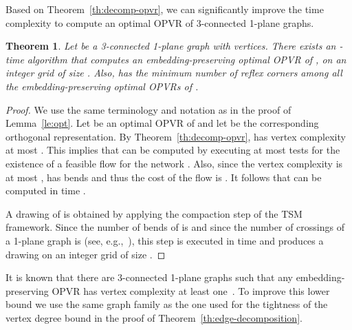 \documentclass{article}
\newtheorem{theorem}{Theorem}
\newcommand{\opvr}{OPVR\xspace}
\begin{document}
Based on Theorem~\ref{th:decomp-opvr}, we can significantly improve the time complexity to compute an optimal \opvr of 3-connected 1-plane graphs.

\begin{theorem}\label{th:3conn-ub}
Let  be a 3-connected 1-plane graph with  vertices. There exists an  -time algorithm that computes an embedding-preserving optimal \opvr  of , on an integer grid of size . Also,  has the minimum number of reflex corners among all the embedding-preserving optimal {\opvr}s of .
\end{theorem}
\begin{proof}
We use the same terminology and notation as in the proof of Lemma~\ref{le:opt}. Let  be an optimal \opvr of  and let  be the corresponding orthogonal representation. By Theorem~\ref{th:decomp-opvr},  has vertex complexity at most . This implies that  can be computed by executing at most  tests for the existence of a feasible flow for the network . Also, since the vertex complexity is at most ,  has  bends and thus the cost of the flow is . It follows that  can be computed in time .

A drawing of  is obtained by applying the compaction step of the TSM framework. Since the number of bends of  is  and since the number of crossings of a 1-plane graph is  (see, e.g.,~\cite{Suzuki2010}), this step is executed in  time and produces a drawing on an integer grid of  size .
\end{proof}


It is known that there are 3-connected 1-plane graphs such that any  embedding-preserving \opvr has vertex complexity at least one~\cite{SoCG}. To improve this lower bound we use the same graph family as the one used for the tightness of the vertex degree bound in the proof of Theorem~\ref{th:edge-decomposition}.
\end{document}
